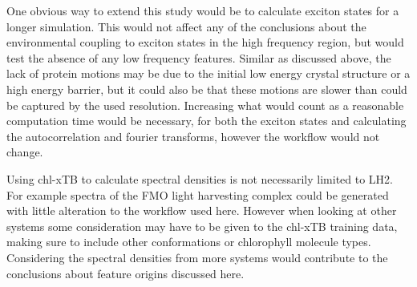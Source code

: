 One obvious way to extend this study would be to calculate exciton states for a 
longer simulation. This would not affect any of the conclusions about the environmental
coupling to exciton states in the high frequency region, but would test the absence
of any low frequency features. Similar as discussed above, the lack of protein motions
may be due to the initial low energy crystal structure or a high energy barrier,
but it could also be that these motions are slower than could be captured by the
used resolution. Increasing what would count as a reasonable computation time would
be necessary, for both the exciton states and calculating the autocorrelation and
fourier transforms, however the workflow would not change.

Using chl-xTB to calculate spectral densities is not necessarily limited to LH2.
For example spectra of the FMO light harvesting complex could be generated with
little alteration to the workflow used here. However when looking at other systems 
some consideration may have to be given to the chl-xTB training data, making sure
to include other conformations or chlorophyll molecule types. Considering the spectral
densities from more systems would contribute to the conclusions about feature origins
discussed here.
